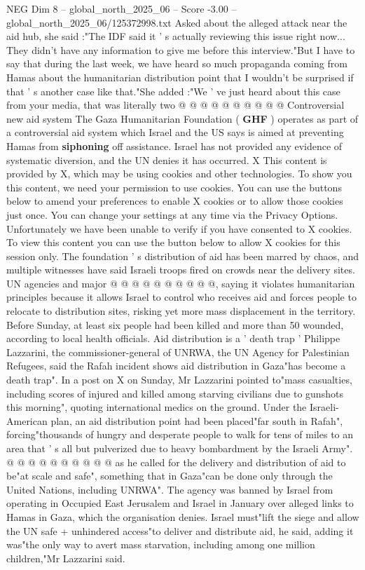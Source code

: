 \begin{textsample}{NEG Dim 8 – global\_north\_2025\_06 – Score -3.00 – global\_north\_2025\_06/125372998.txt}
Asked about the alleged attack near the aid hub, she said :"The IDF said it ' s actually reviewing this issue right now...
They didn't have any information to give me before this interview."But I have to say that during the last week, we have heard so much propaganda coming from Hamas about the humanitarian distribution point that I wouldn't be surprised if that ' s another case like that."She added :"We ' ve just heard about this case from your media, that was literally two @ @ @ @ @ @ @ @ @ @ Controversial new aid system The Gaza Humanitarian Foundation ( \textbf{GHF} ) operates as part of a controversial aid system which Israel and the US says is aimed at preventing Hamas from \textbf{siphoning} off assistance.
Israel has not provided any evidence of systematic diversion, and the UN denies it has occurred.
X This content is provided by X, which may be using cookies and other technologies.
To show you this content, we need your permission to use cookies.
You can use the buttons below to amend your preferences to enable X cookies or to allow those cookies just once.
You can change your settings at any time via the Privacy Options.
Unfortunately we have been unable to verify if you have consented to X cookies.
To view this content you can use the button below to allow X cookies for this session only.
The foundation ' s distribution of aid has been marred by chaos, and multiple witnesses have said Israeli troops fired on crowds near the delivery sites.
UN agencies and major @ @ @ @ @ @ @ @ @ @, saying it violates humanitarian principles because it allows Israel to control who receives aid and forces people to relocate to distribution sites, risking yet more mass displacement in the territory.
Before Sunday, at least six people had been killed and more than 50 wounded, according to local health officials.
Aid distribution is a ' death trap ' Philippe Lazzarini, the commissioner-general of UNRWA, the UN Agency for Palestinian Refugees, said the Rafah incident shows aid distribution in Gaza"has become a death trap".
In a post on X on Sunday, Mr Lazzarini pointed to"mass casualties, including scores of injured and killed among starving civilians due to gunshots this morning", quoting international medics on the ground.
Under the Israeli-American plan, an aid distribution point had been placed"far south in Rafah", forcing"thousands of hungry and desperate people to walk for tens of miles to an area that ' s all but pulverized due to heavy bombardment by the Israeli Army". @ @ @ @ @ @ @ @ @ @ as he called for the delivery and distribution of aid to be"at scale and safe", something that in Gaza"can be done only through the United Nations, including UNRWA".
The agency was banned by Israel from operating in Occupied East Jerusalem and Israel in January over alleged links to Hamas in Gaza, which the organisation denies.
Israel must"lift the siege and allow the UN safe + unhindered access"to deliver and distribute aid, he said, adding it was"the only way to avert mass starvation, including among one million children,"Mr Lazzarini said.

\end{textsample}
